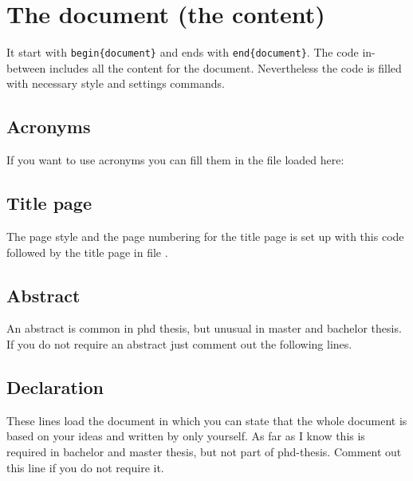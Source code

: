 \section{The document (the content)}
\label{sec:main:document}
It start with \texttt{\bs{}begin\{document\}} and ends with \texttt{\bs{}end\{document\}}.
The code in-between includes all the content for the document. Nevertheless the code is filled with necessary style and settings commands.

\subsection{Acronyms}
If you want to use acronyms you can fill them in the file loaded here:
%
\subsection{Title page}
The page style and the page numbering for the title page is set up with this code
%
followed by the title page in file .

\subsection{Abstract}
An abstract is common in phd thesis, but unusual in master and bachelor thesis. If you do not require an abstract just comment out the following lines.

\subsection{Declaration}
These lines load the document  in which you can state that the whole document is based on your ideas and written by only yourself. As far as I know this is required in bachelor and master thesis, but not part of phd-thesis. Comment out this line if you do not require it.

